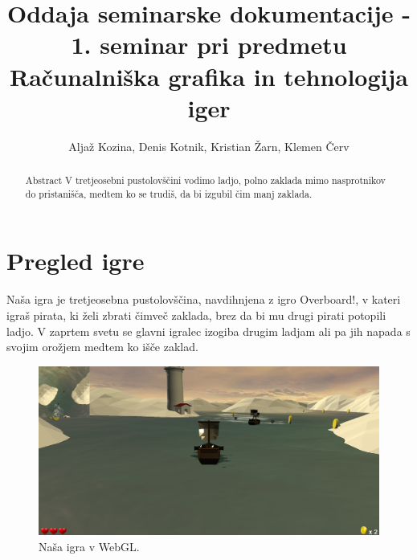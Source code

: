 \documentclass[a4paper]{article}
\begin{document}
\title{Oddaja seminarske dokumentacije - 1. seminar pri predmetu Računalniška grafika in tehnologija iger}

\author{Aljaž Kozina, Denis Kotnik, Kristian Žarn, Klemen Červ}



\maketitle


\begin{abstract}{Abstract}
V tretjeosebni pustolovščini vodimo ladjo, polno zaklada mimo nasprotnikov do pristanišča, medtem ko se trudiš, da bi izgubil čim manj zaklada.
\end{abstract}



\section{Pregled igre}
Naša igra je tretjeosebna pustolovščina, navdihnjena z igro Overboard!\cite{wiki:Overboard!}, v kateri igraš pirata, ki želi zbrati čimveč zaklada, brez da bi mu drugi pirati potopili ladjo. V zaprtem svetu se glavni igralec izogiba drugim ladjam ali pa jih napada s svojim orožjem medtem ko išče zaklad.

\begin{figure}[H]
    \begin{center}
        \includegraphics[width=\columnwidth]{Screenshot.png}
        \caption{Naša igra v WebGL.} \label{fig:slika}
    \end{center}
\end{figure}
\end{document}
